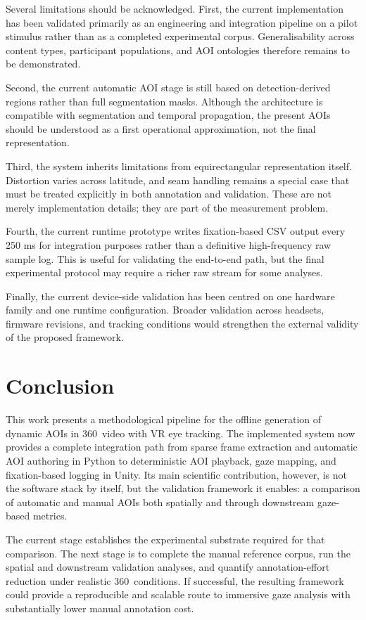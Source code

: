 \documentclass[11pt]{article}
\begin{document}
Several limitations should be acknowledged. First, the current implementation has been validated primarily as an engineering and integration pipeline on a pilot stimulus rather than as a completed experimental corpus. Generalisability across content types, participant populations, and AOI ontologies therefore remains to be demonstrated.

Second, the current automatic AOI stage is still based on detection-derived regions rather than full segmentation masks. Although the architecture is compatible with segmentation and temporal propagation, the present AOIs should be understood as a first operational approximation, not the final representation.

Third, the system inherits limitations from equirectangular representation itself. Distortion varies across latitude, and seam handling remains a special case that must be treated explicitly in both annotation and validation. These are not merely implementation details; they are part of the measurement problem.

Fourth, the current runtime prototype writes fixation-based CSV output every 250 ms for integration purposes rather than a definitive high-frequency raw sample log. This is useful for validating the end-to-end path, but the final experimental protocol may require a richer raw stream for some analyses.

Finally, the current device-side validation has been centred on one hardware family and one runtime configuration. Broader validation across headsets, firmware revisions, and tracking conditions would strengthen the external validity of the proposed framework.

\section{Conclusion}

This work presents a methodological pipeline for the offline generation of dynamic AOIs in 360\textdegree\ video with VR eye tracking. The implemented system now provides a complete integration path from sparse frame extraction and automatic AOI authoring in Python to deterministic AOI playback, gaze mapping, and fixation-based logging in Unity. Its main scientific contribution, however, is not the software stack by itself, but the validation framework it enables: a comparison of automatic and manual AOIs both spatially and through downstream gaze-based metrics.

The current stage establishes the experimental substrate required for that comparison. The next stage is to complete the manual reference corpus, run the spatial and downstream validation analyses, and quantify annotation-effort reduction under realistic 360\textdegree\ conditions. If successful, the resulting framework could provide a reproducible and scalable route to immersive gaze analysis with substantially lower manual annotation cost.



\end{document}
